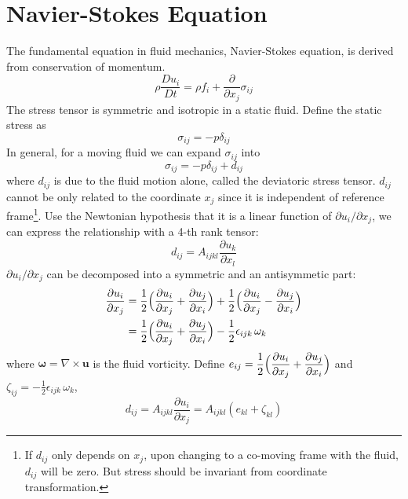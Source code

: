 \section{Navier-Stokes Equation}
The fundamental equation in fluid mechanics, Navier-Stokes equation,
is derived from conservation of momentum.
\begin{equation*}
    \rho\frac{D u_i}{D t} = \rho f_i + \frac{\partial}{\partial
    x_j}\sigma_{ij}
\end{equation*}
The stress tensor is symmetric and isotropic in a static fluid.
Define the static stress as
\begin{equation}\label{nav1}
    \sigma_{ij}=-p\delta_{ij}
\end{equation}
In general, for a moving fluid we can expand $\sigma_{ij}$ into
\begin{equation}\label{nav2}
    \sigma_{ij}=-p\delta_{ij}+d_{ij}
\end{equation}
where $d_{ij}$ is due to the fluid motion alone, called the
deviatoric stress tensor. $d_{ij}$ cannot be only related to the
coordinate $x_j$ since it is independent of reference
frame\footnote{If $d_{ij}$ only depends on $x_j$, upon changing to a
co-moving frame with the fluid, $d_{ij}$ will be zero. But stress
should be invariant from coordinate transformation.}. Use the
Newtonian hypothesis that it is a linear function of $\partial
u_i/\partial x_j$, we can express the relationship with a 4-th rank
tensor:
\begin{equation}\label{nav3}
    d_{ij}=A_{ijkl}\frac{\partial u_k}{\partial x_l}
\end{equation}
$\partial u_i/\partial x_j$ can be decomposed into a symmetric and
an antisymmetic part:
\begin{align*}
    \frac{\partial u_i}{\partial x_j}&=
    \frac{1}{2}\Bigl(\frac{\partial u_i}{\partial x_j}+\frac{\partial u_j}{\partial
    x_i}\Bigr)
    +\frac{1}{2}\Bigl(\frac{\partial u_i}{\partial
    x_j}-\frac{\partial u_j}{\partial
    x_i}\Bigr)\\
    &=\frac{1}{2}\Bigl(\frac{\partial u_i}{\partial x_j}+\frac{\partial u_j}{\partial
    x_i}\Bigr)
    -\frac{1}{2}\epsilon_{ijk}\,\omega_k
\end{align*}
where $\mathbf{\omega}=\nabla\times\mathbf{u}$ is the fluid
vorticity. Define $e_{ij}=\dfrac{1}{2}\Bigl(\dfrac{\partial
u_i}{\partial x_j}+\dfrac{\partial u_j}{\partial
    x_i}\Bigr)$ and
$\zeta_{ij}=-\frac{1}{2}\epsilon_{ijk}\,\omega_k$,
\begin{equation}\label{nav4}
    d_{ij}=A_{ijkl}\frac{\partial u_i}{\partial
    x_j}=A_{ijkl}(e_{kl}+\zeta_{kl})
\end{equation}
